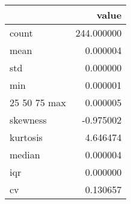\begin{tabular}{lr}
\toprule
 & value \\
\midrule
count & 244.000000 \\
mean & 0.000004 \\
std & 0.000000 \\
min & 0.000001 \\
25%
50%
75%
max & 0.000005 \\
skewness & -0.975002 \\
kurtosis & 4.646474 \\
median & 0.000004 \\
iqr & 0.000000 \\
cv & 0.130657 \\
\bottomrule
\end{tabular}
